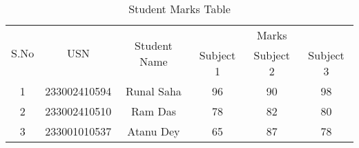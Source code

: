 \documentclass{article}
\begin{document}
\begin{table}[h!]
\centering
\begin{tabular}{|c|c|c|c|c|c|}
\hline
\multirow{2}{*}{S.No} & \multirow{2}{*}{USN} & \multirow{2}{*}{Student Name} & \multicolumn{3}{c|}{Marks} \\ \cline{4-6} 
                      &                      &                               & Subject 1 & Subject 2 & Subject 3 \\ \hline
1                     & 233002410594                & Runal Saha            & 96        & 90        & 98        \\ \hline
2                     & 233002410510                & Ram Das                    & 78        & 82        & 80        \\ \hline
3                     & 233001010537                & Atanu Dey                 & 65        & 87        & 78        \\ \hline
\end{tabular}
\caption{Student Marks Table}
\label{tab:student_marks}
\end{table}
\end{document}
